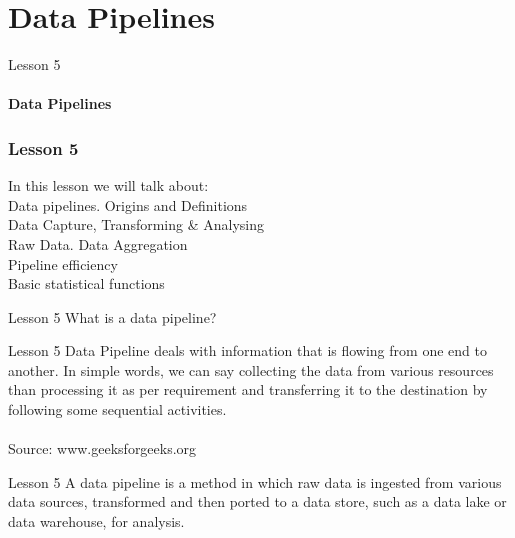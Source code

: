 \documentclass[aspectratio=1610]{beamer}
\begin{document}
\section{Data Pipelines}

\begin{frame}
\begin{center}
\Huge Lesson 5\\~\\
\textbf{Data Pipelines}
\end{center}
\end{frame}


\begin{frame}
\frametitle{Lesson 5}
\Huge In this lesson we will talk about:\\
\huge
 \alert{Data pipelines. Origins and Definitions}\\
 \alert{Data Capture, Transforming \& Analysing}\\
 \alert{Raw Data. Data Aggregation}\\
 \alert{Pipeline efficiency}\\
 \alert{Basic statistical functions}
\end{frame}




\begin{frame}{Lesson 5}{}
\Huge
 What is a data pipeline?
 \end{frame}



\begin{frame}{Lesson 5}{}
\LARGE
Data Pipeline deals with information that is flowing from one end to 
another. In simple words, we can say collecting the data from various 
resources than processing it as per requirement and transferring it 
to the destination by following some sequential activities.\\~\\
Source: www.geeksforgeeks.org
\end{frame}

\begin{frame}
\end{frame}



\begin{frame}{Lesson 5}{}
\LARGE
A data pipeline is a method in which raw data is ingested from 
various data sources, transformed and then ported to a data store, 
such as a data lake or data warehouse, for analysis.
\end{frame}
\end{document}
